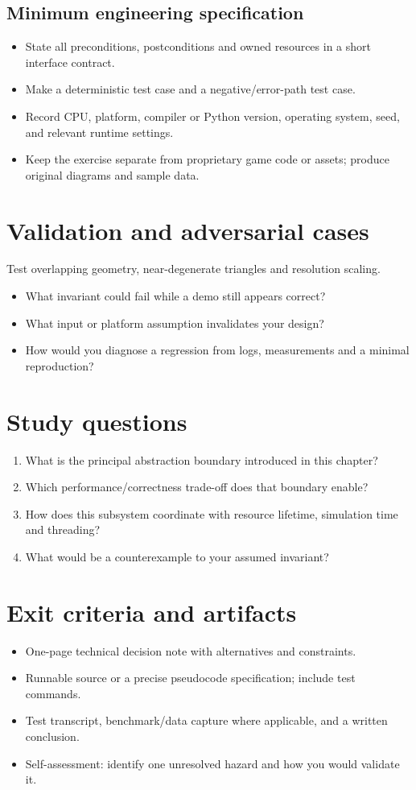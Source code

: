 \documentclass[11pt,letterpaper]{article}
\begin{document}
\subsection{Minimum engineering specification}
\begin{itemize}
\item State all preconditions, postconditions and owned resources in a short interface contract.
\item Make a deterministic test case and a negative/error-path test case.
\item Record CPU, platform, compiler or Python version, operating system, seed, and relevant runtime settings.
\item Keep the exercise separate from proprietary game code or assets; produce original diagrams and sample data.
\end{itemize}
\section{Validation and adversarial cases}
Test overlapping geometry, near-degenerate triangles and resolution scaling.

\begin{itemize}
\item What invariant could fail while a demo still appears correct?
\item What input or platform assumption invalidates your design?
\item How would you diagnose a regression from logs, measurements and a minimal reproduction?
\end{itemize}
\section{Study questions}
\begin{enumerate}
\item What is the principal abstraction boundary introduced in this chapter?
\item Which performance/correctness trade-off does that boundary enable?
\item How does this subsystem coordinate with resource lifetime, simulation time and threading?
\item What would be a counterexample to your assumed invariant?
\end{enumerate}
\section{Exit criteria and artifacts}
\begin{itemize}
\item One-page technical decision note with alternatives and constraints.
\item Runnable source or a precise pseudocode specification; include test commands.
\item Test transcript, benchmark/data capture where applicable, and a written conclusion.
\item Self-assessment: identify one unresolved hazard and how you would validate it.
\end{itemize}
\end{document}
